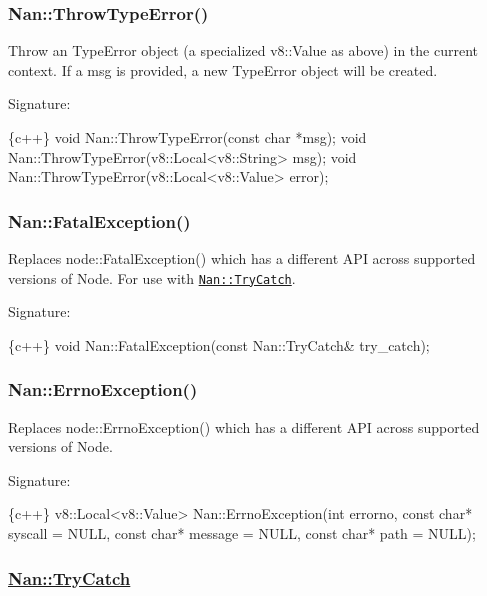 \label{_api_nan_throw_type_error}%
 \subsubsection*{Nan\+::\+Throw\+Type\+Error()}

Throw an Type\+Error object (a specialized {\ttfamily v8\+::\+Value} as above) in the current context. If a {\ttfamily msg} is provided, a new Type\+Error object will be created.

Signature\+:


\begin{DoxyCode}
\{c++\}
void Nan::ThrowTypeError(const char *msg);
void Nan::ThrowTypeError(v8::Local<v8::String> msg);
void Nan::ThrowTypeError(v8::Local<v8::Value> error);
\end{DoxyCode}


\label{_api_nan_fatal_exception}%
 \subsubsection*{Nan\+::\+Fatal\+Exception()}

Replaces {\ttfamily node\+::\+Fatal\+Exception()} which has a different A\+PI across supported versions of Node. For use with \href{#api_nan_try_catch}{\tt {\ttfamily Nan\+::\+Try\+Catch}}.

Signature\+:


\begin{DoxyCode}
\{c++\}
void Nan::FatalException(const Nan::TryCatch& try\_catch);
\end{DoxyCode}


\label{_api_nan_errno_exception}%
 \subsubsection*{Nan\+::\+Errno\+Exception()}

Replaces {\ttfamily node\+::\+Errno\+Exception()} which has a different A\+PI across supported versions of Node.

Signature\+:


\begin{DoxyCode}
\{c++\}
v8::Local<v8::Value> Nan::ErrnoException(int errorno,
                                         const char* syscall = NULL,
                                         const char* message = NULL,
                                         const char* path = NULL);
\end{DoxyCode}


\label{_api_nan_try_catch}%
 \subsubsection*{\hyperlink{class_nan_1_1_try_catch}{Nan\+::\+Try\+Catch}}

